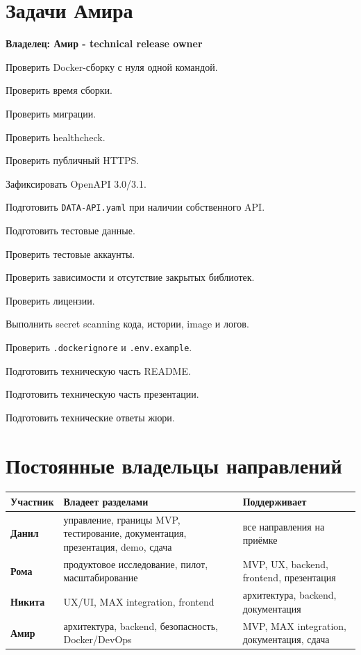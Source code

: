 \documentclass[11pt,a4paper]{article}
\newcommand{\code}[1]{\texttt{#1}}\newcommand{\owner}[1]{\textcolor{MaxPurple}{\textbf{Владелец: #1}}}
\begin{document}
\section{Задачи Амира}
\owner{Амир - technical release owner}
\begin{tasklist}
  \item Проверить Docker-сборку с нуля одной командой.
  \item Проверить время сборки.
  \item Проверить миграции.
  \item Проверить healthcheck.
  \item Проверить публичный HTTPS.
  \item Зафиксировать OpenAPI 3.0/3.1.
  \item Подготовить \code{DATA-API.yaml} при наличии собственного API.
  \item Подготовить тестовые данные.
  \item Проверить тестовые аккаунты.
  \item Проверить зависимости и отсутствие закрытых библиотек.
  \item Проверить лицензии.
  \item Выполнить secret scanning кода, истории, image и логов.
  \item Проверить \code{.dockerignore} и \code{.env.example}.
  \item Подготовить техническую часть README.
  \item Подготовить техническую часть презентации.
  \item Подготовить технические ответы жюри.
\end{tasklist}

\section{Постоянные владельцы направлений}
\begin{tabularx}{\textwidth}{>{\bfseries}p{25mm}X X}\toprule
Участник & Владеет разделами & Поддерживает\\\midrule
Данил & управление, границы MVP, тестирование, документация, презентация, demo, сдача & все направления на приёмке\\
Рома & продуктовое исследование, пилот, масштабирование & MVP, UX, backend, frontend, презентация\\
Никита & UX/UI, MAX integration, frontend & архитектура, backend, документация\\
Амир & архитектура, backend, безопасность, Docker/DevOps & MVP, MAX integration, документация, сдача\\\bottomrule
\end{tabularx}
\end{document}
